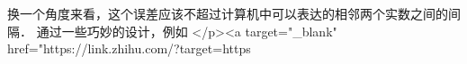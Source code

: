 换一个角度来看，这个误差应该不超过计算机中可以表达的相邻两个实数之间的间隔． 通过一些巧妙的设计，例如 </p><a target="_blank" href="https://link.zhihu.com/?target=https%
